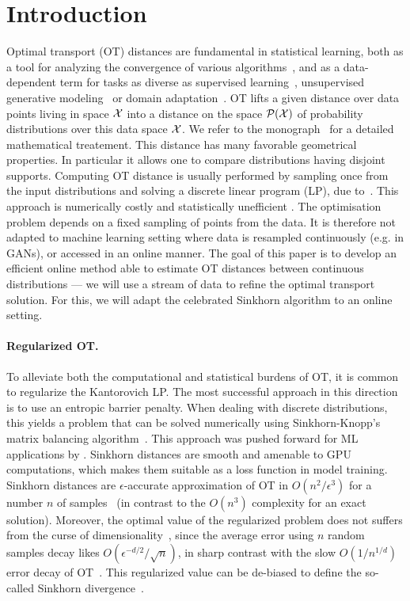 \section{Introduction}

Optimal transport (OT) distances are fundamental in statistical learning, both as a tool for analyzing the convergence of various algorithms~\cite{canas2012learning,dalalyan2019user}, and as a data-dependent term for tasks as diverse as supervised learning~\cite{frogner2015learning}, unsupervised generative modeling~\cite{arjovsky2017wgan} or domain adaptation~\cite{courty2016optimal}.
%
OT lifts a given distance over data points living in space $\mathcal{X}$ into a distance
on the space $\mathcal{P}(\mathcal{X})$ of probability distributions over this data space $\mathcal{X}$. We refer to the monograph~\cite{santambrogio2015optimal} for a detailed mathematical treatement.
%
This distance has many favorable geometrical properties. In particular it allows one to compare distributions having disjoint supports. 
% 
Computing OT distance is usually performed by sampling once from the input
distributions and solving a discrete linear program (LP), due to~\citet{Kantorovich42}. This approach is numerically costly and
statistically unefficient \cite{weed2019sharp}. The optimisation problem depends
on a fixed sampling of points from the data. It is therefore not adapted to
machine learning setting where data is resampled continuously (e.g. in GANs), or
accessed in an online manner. The goal of this paper is to develop an efficient
online method able to estimate OT distances between continuous distributions ---
we will use a stream of data to refine the optimal transport solution. For this, we will
adapt the celebrated Sinkhorn algorithm to an online setting.
  


\paragraph{Regularized OT.}

To alleviate both the computational and statistical burdens of OT, it is common
to regularize the Kantorovich LP.
%
The most successful approach in this direction is to use an entropic barrier penalty. 
%
When dealing with discrete distributions, this yields a problem that can be solved
numerically using Sinkhorn-Knopp's matrix balancing
algorithm~\cite{Sinkhorn64,sinkhorn1967concerning}.
%
This approach was pushed forward for ML applications
by \citet{cuturi2013sinkhorn}. Sinkhorn distances are smooth and amenable to GPU computations, which makes them suitable as a loss function in model training.
%
Sinkhorn distances are $\epsilon$-accurate approximation of OT in
$O(n^2/\epsilon^3)$ for a number $n$ of samples~\cite{altschuler2017near} (in
contrast to the $O(n^3)$ complexity for an exact solution). Moreover, the optimal
value of the regularized problem does not suffers from the curse of
dimensionality~\cite{2019-Genevay-aistats}, since the average error using $n$
random samples decay likes $O(\epsilon^{-d/2}/\sqrt{n})$, in sharp contrast with
the slow $O(1/n^{1/d})$ error decay of OT~\cite{weed2019sharp}. This regularized
value can be de-biased to define the so-called Sinkhorn
divergence~\cite{2019-Feydy-aistats}.  

